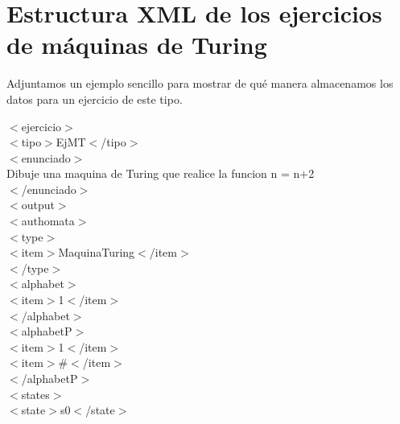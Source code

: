 \documentclass[12pt,a4paper,spanish]{book}
\begin{document}
\section{Estructura XML de los ejercicios de m\'aquinas de Turing}
Adjuntamos un ejemplo sencillo para mostrar de qu\'e manera almacenamos los datos para un ejercicio de este tipo.\\
\newline
{\ttfamily

\noindent

$<$ejercicio$>$\\

$<$tipo$>$EjMT$<$/tipo$>$\\

$<$enunciado$>$\\

Dibuje una maquina de Turing que realice la funcion n = n+2\\

$<$/enunciado$>$\\

$<$output$>$\\

$<$authomata$>$\\

\indent $<$type$>$\\

\indent \indent $<$item$>$MaquinaTuring$<$/item$>$\\

\indent $<$/type$>$\\

\indent $<$alphabet$>$\\

\indent \indent $<$item$>$1$<$/item$>$\\

\indent $<$/alphabet$>$\\

\indent $<$alphabetP$>$\\

\indent \indent $<$item$>$1$<$/item$>$\\

\indent \indent $<$item$>$\#$<$/item$>$\\

\indent $<$/alphabetP$>$\\

\indent $<$states$>$\\

\indent \indent $<$state$>$s0$<$/state$>$\\

}
\end{document}

